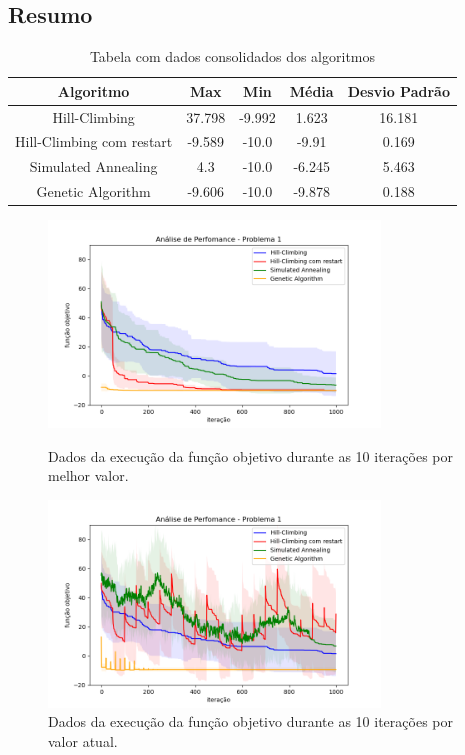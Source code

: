\subsection{Resumo}

\begin{table}[h!]
\centering
\begin{tabular}{ |c|c|c|c|c|  }
\hline
\rowcolor{lightgray}
Algoritmo & Max & Min & Média & Desvio Padrão \\
\hline
Hill-Climbing & 37.798 & -9.992 & 1.623 & 16.181 \\
\hline
Hill-Climbing com restart & -9.589 & -10.0 & -9.91 & 0.169 \\
\hline
Simulated Annealing & 4.3 & -10.0 & -6.245 & 5.463 \\
\hline
Genetic Algorithm & -9.606 & -10.0 & -9.878 & 0.188 \\
\hline

\end{tabular}
\caption{Tabela com dados consolidados dos algoritmos}
\end{table}

\begin{figure}[H]
\centering
  \begin{minipage}[b]{0.48\textwidth}
    \includegraphics[width=88mm]{imagens/otima/problema-1-performance-algoritmos-best.png}
    \caption{Dados da execução da função objetivo durante as 10 iterações por melhor valor.
    \label{fig:problema-1-performance-algoritmos-best}}
  \end{minipage}
  \hfill
  \begin{minipage}[b]{0.48\textwidth}
    \includegraphics[width=88mm]{imagens/otima/problema-1-performance-algoritmos-value.png}
    \caption{Dados da execução da função objetivo durante as 10 iterações por valor atual.
    \label{fig:problema-1-performance-algoritmos-value}}
  \end{minipage}
\end{figure}